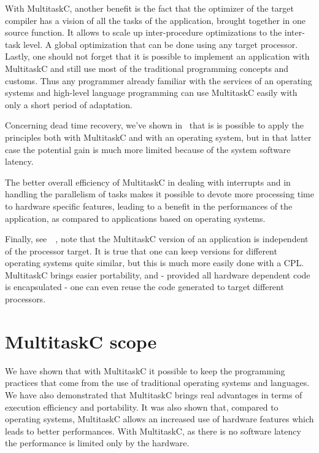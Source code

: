 \documentclass[10pt]{report}
\begin{document}
With MultitaskC, another benefit is the fact that the optimizer of the target compiler has a vision of all the tasks of the application, 
brought together in one source function. It allows to scale up inter-procedure optimizations to the inter-task level. A global 
optimization that can be done using any target processor. Lastly, one should not forget that it is possible to implement an 
application with MultitaskC and still use most of the traditional programming concepts and customs. Thus any programmer already 
familiar with the services of an operating systems and high-level language programming can use MultitaskC easily with only a short 
period of adaptation.

Concerning dead time recovery, we've shown in~\cite{Delchini:95} that is is possible to apply the principles both with MultitaskC 
and with an operating system, but in that latter case the potential gain is much more limited because of the system software latency.

The better overall efficiency of MultitaskC in dealing with interrupts and in handling the parallelism of tasks makes it possible 
to devote more processing time to hardware specific features, leading to a benefit in the performances of the application, as compared to 
applications based on operating systems. 

Finally, see~~\cite{Delchini:95}, note that the MultitaskC version of an application is independent of the processor target. 
It is true that one can keep versions for different operating systems quite similar, but this is much more easily done with a CPL. 
MultitaskC brings easier portability, and - provided all hardware dependent code is encapsulated - one can even reuse the code 
generated to target different processors.

\section{MultitaskC scope}

We have shown that with MultitaskC it possible to keep the programming practices that come from the use of traditional
operating systems and languages. We have also demonstrated that MultitaskC brings real advantages in terms of
execution efficiency and portability. It was also shown that, compared to operating systems, MultitaskC allows an increased use of 
hardware features which leads to better performances. With MultitaskC, as there is no software latency the performance is limited 
only by the hardware.
\end{document}
